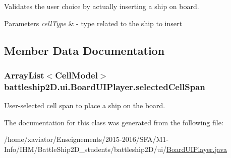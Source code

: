 Validates the user choice by actually inserting a ship on board. 


\begin{DoxyParams}{Parameters}
{\em cell\-Type} & -\/ type related to the ship to insert \\
\hline
\end{DoxyParams}


\subsection{Member Data Documentation}
\hypertarget{classbattleship2D_1_1ui_1_1BoardUIPlayer_a3a625b31f12b372502d3f48e07a9bc59}{
\subsubsection[{selected\-Cell\-Span}]{\setlength{\rightskip}{0pt plus 5cm}Array\-List$<${\bf Cell\-Model}$>$ battleship2\-D.\-ui.\-Board\-U\-I\-Player.\-selected\-Cell\-Span\hspace{0.3cm}{\ttfamily [private]}}}\label{classbattleship2D_1_1ui_1_1BoardUIPlayer_a3a625b31f12b372502d3f48e07a9bc59}


User-\/selected cell span to place a ship on the board. 



The documentation for this class was generated from the following file\-:\begin{DoxyCompactItemize}
\item 
/home/xaviator/\-Enseignements/2015-\/2016/\-S\-F\-A/\-M1-\/\-Info/\-I\-H\-M/\-Battle\-Ship2\-D\-\_\-students/battleship2\-D/ui/\hyperlink{BoardUIPlayer_8java}{Board\-U\-I\-Player.\-java}\end{DoxyCompactItemize}
